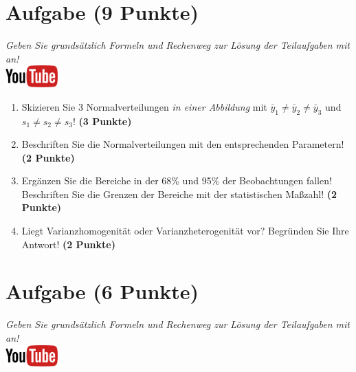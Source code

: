 \documentclass[a4paper, 10pt]{scrartcl}\usepackage[]{graphicx}\usepackage[]{xcolor}
\begin{document}
 
\clearpage

\section{Aufgabe \hfill (9 Punkte)}

\textit{Geben Sie grunds{\"a}tzlich Formeln und Rechenweg zur L{\"o}sung der
  Teilaufgaben mit an!} \\[1Ex]

\hfill\href{https://youtu.be/ZrJhn2wPbq4}{\includegraphics[width =
  2cm]{img/youtube}}\\[1Ex]



\begin{enumerate}
\item Skizieren Sie $3$ Normalverteilungen \textit{in einer
    Abbildung} mit $\bar{y}_1 \neq \bar{y}_2 \neq \bar{y}_3$ und $s_1 \neq s_2 \neq s_3$! \textbf{(3 Punkte)}
\item Beschriften Sie die Normalverteilungen mit den entsprechenden
  Parametern! \textbf{(2 Punkte)}
\item Erg{\"a}nzen Sie die Bereiche in der 68\% und 95\% der Beobachtungen
  fallen! Beschriften Sie die Grenzen der Bereiche mit der statistischen Ma{\ss}zahl! \textbf{(2 Punkte)}
\item Liegt Varianzhomogenit{\"a}t oder Varianzheterogenit{\"a}t vor? Begr{\"u}nden Sie
  Ihre Antwort! \textbf{(2 Punkte)}
\end{enumerate}

 
\clearpage

\section{Aufgabe \hfill (6 Punkte)}

\textit{Geben Sie grunds{\"a}tzlich Formeln und Rechenweg zur L{\"o}sung der
  Teilaufgaben mit an!} \\[1Ex]

\hfill\href{https://youtu.be/aXvxGC4YLqk}{\includegraphics[width =
  2cm]{img/youtube}}\\[1Ex]
\end{document}
